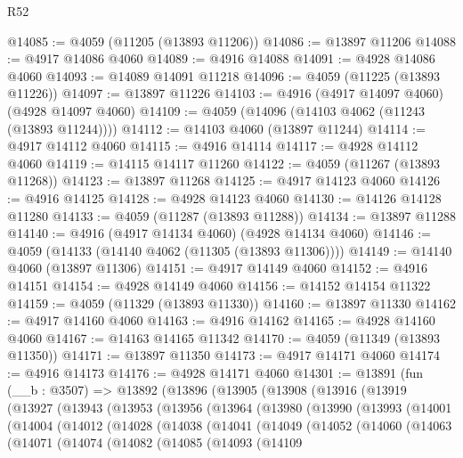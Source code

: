\begin{lexlean}{R52}
\begin{coremodule}
@14085 := @4059 (@11205 (@13893 @11206))
@14086 := @13897 @11206
@14088 := @4917 @14086 @4060
@14089 := @4916 @14088
@14091 := @4928 @14086 @4060
@14093 := @14089 @14091 @11218
@14096 := @4059 (@11225 (@13893 @11226))
@14097 := @13897 @11226
@14103 := @4916 (@4917 @14097 @4060) (@4928 @14097 @4060)
@14109 := @4059 (@14096 (@14103 @4062 (@11243 (@13893 @11244))))
@14112 := @14103 @4060 (@13897 @11244)
@14114 := @4917 @14112 @4060
@14115 := @4916 @14114
@14117 := @4928 @14112 @4060
@14119 := @14115 @14117 @11260
@14122 := @4059 (@11267 (@13893 @11268))
@14123 := @13897 @11268
@14125 := @4917 @14123 @4060
@14126 := @4916 @14125
@14128 := @4928 @14123 @4060
@14130 := @14126 @14128 @11280
@14133 := @4059 (@11287 (@13893 @11288))
@14134 := @13897 @11288
@14140 := @4916 (@4917 @14134 @4060) (@4928 @14134 @4060)
@14146 := @4059 (@14133 (@14140 @4062 (@11305 (@13893 @11306))))
@14149 := @14140 @4060 (@13897 @11306)
@14151 := @4917 @14149 @4060
@14152 := @4916 @14151
@14154 := @4928 @14149 @4060
@14156 := @14152 @14154 @11322
@14159 := @4059 (@11329 (@13893 @11330))
@14160 := @13897 @11330
@14162 := @4917 @14160 @4060
@14163 := @4916 @14162
@14165 := @4928 @14160 @4060
@14167 := @14163 @14165 @11342
@14170 := @4059 (@11349 (@13893 @11350))
@14171 := @13897 @11350
@14173 := @4917 @14171 @4060
@14174 := @4916 @14173
@14176 := @4928 @14171 @4060
@14301 := @13891
    (fun (__b : @3507) =>
    @13892
      (@13896
        (@13905
          (@13908
            (@13916
              (@13919
                (@13927
                  (@13943
                    (@13953
                      (@13956
                        (@13964
                          (@13980
                            (@13990
                              (@13993
                                (@14001
                                  (@14004
                                    (@14012
                                      (@14028
                                        (@14038
                                          (@14041
                                            (@14049
                                              (@14052
                                                (@14060
                                                  (@14063
                                                    (@14071
                                                      (@14074
                                                        (@14082
                                                          (@14085
                                                            (@14093
                                                              (@14109

\end{coremodule}
\end{lexlean}
